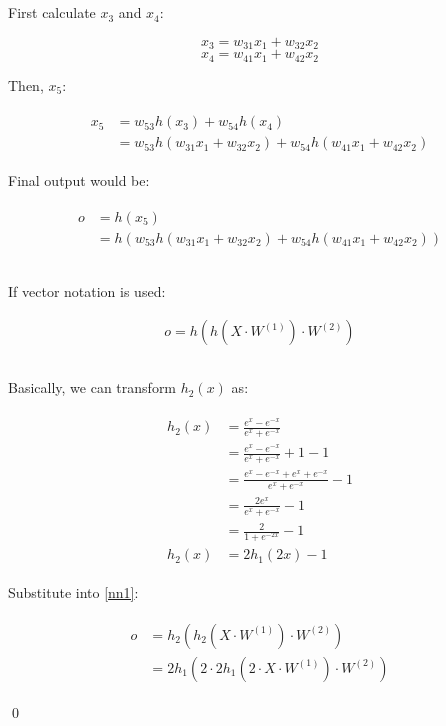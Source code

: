 \documentclass[preview]{standalone}
\begin{document}
\section{}

\subsection{}

First calculate $x_3$ and $x_4$:

\[x_3 = w_{31} x_1 + w_{32} x_2\]
\[x_4 = w_{41} x_1 + w_{42} x_2\]

Then, $x_5$:

\begin{align}
\begin{split}
x_5 &= w_{53} h(x_3) + w_{54} h(x_4)\\
    &= w_{53} h(w_{31} x_1 + w_{32} x_2) + w_{54} h(w_{41} x_1 + w_{42} x_2)
\end{split}
\end{align}

Final output would be:

\begin{align}
\begin{split}
o
&= h(x_5)\\
&= h(w_{53} h(w_{31} x_1 + w_{32} x_2) + w_{54} h(w_{41} x_1 + w_{42} x_2))
\end{split}
\end{align}

\subsection{}

If vector notation is used:

\begin{align}
    \label{nn1}
    o = h(h(X \cdot W^{(1)}) \cdot W^{(2)})
\end{align}

\subsection{}

Basically, we can transform $h_2(x)$ as:

\begin{align}
\begin{split}
    h_2(x) &= \frac{e^x-e^{-x}}{e^x+e^{-x}}\\
           &= \frac{e^x-e^{-x}}{e^x+e^{-x}} + 1 - 1\\
           &= \frac{e^x-e^{-x} + e^x + e^{-x}}{e^x+e^{-x}} - 1\\
           &= \frac{2e^x}{e^x+e^{-x}} - 1\\
           &= \frac{2}{1+e^{-2x}} - 1\\
    h_2(x) &= 2h_1(2x)-1
\end{split}
\end{align}

Substitute into \cref{nn1}:

\begin{align}
\begin{split}
o &= h_2(h_2(X \cdot W^{(1)}) \cdot W^{(2)}) \\
  &= 2h_1(2 \cdot 2h_1(2 \cdot X \cdot W^{(1)}) \cdot W^{(2)})
\end{split}
\end{align}

\qed
\end{document}
